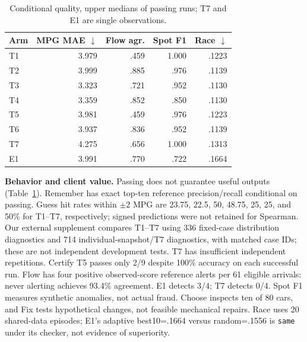 \documentclass[sigconf,nonacm]{acmart}
\begin{document}
\begin{table}[t]
\caption{Conditional quality, upper medians of passing runs; T7 and E1 are single observations.}\label{tab:quality}\centering\scriptsize
\begin{tabular}{@{}lrrrr@{}}\toprule
Arm & MPG MAE $\downarrow$ & Flow agr. & Spot F1 & Race $\downarrow$\\\midrule
T1&3.979&.459&1.000&.1223\\
T2&3.999&.885&.976&.1139\\
T3&3.323&.721&.952&.1130\\
T4&3.359&.852&.850&.1130\\
T5&3.981&.459&.976&.1223\\
T6&3.937&.836&.952&.1139\\
T7&4.275&.656&1.000&.1313\\
E1&3.991&.770&.722&.1664\\\bottomrule
\end{tabular}
\end{table}
\textbf{Behavior and client value.} Passing does not guarantee useful outputs (Table~\ref{tab:quality}). Remember has exact top-ten reference precision/recall conditional on passing. Guess hit rates within $\pm2$ MPG are 23.75, 22.5, 50, 48.75, 25, 25, and 50\% for T1--T7, respectively; signed predictions were not retained for Spearman. Our external supplement compares T1--T7 using 336 fixed-case distribution diagnostics and 714 individual-snapshot/T7 diagnostics, with matched case IDs; these are not independent development tests. T7 has insufficient independent repetitions. Certify T5 passes only 2/9 despite 100\% accuracy on each successful run. Flow has four positive observed-score reference alerts per 61 eligible arrivals: never alerting achieves 93.4\% agreement. E1 detects 3/4; T7 detects 0/4. Spot F1 measures synthetic anomalies, not actual fraud. Choose inspects ten of 80 cars, and Fix tests hypothetical changes, not feasible mechanical repairs. Race uses 20 shared-data episodes; E1's adaptive best10=.1664 versus random=.1556 is \texttt{same} under its checker, not evidence of superiority.
\end{document}
